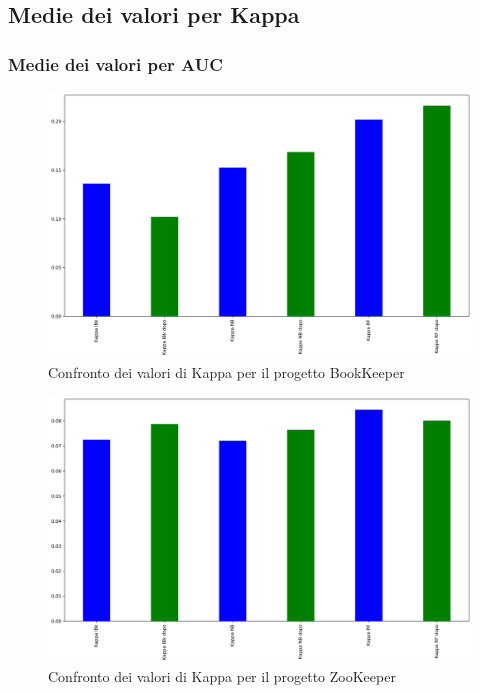 \documentclass[10pt]{beamer}
\begin{document}
\begin{frame}
\section{Medie dei valori per Kappa}
\frametitle{Medie dei valori per AUC}
\begin{minipage}[t]{0.5\textwidth}%
\begin{figure}
\includegraphics[scale=0.18]{images/k_bar_bk}
\caption{Confronto dei valori di Kappa per il progetto BookKeeper}
\end{figure}
\end{minipage}%
\begin{minipage}[t]{0.5\textwidth}
\begin{figure}
\includegraphics[scale=0.18]{images/k_bar_zk}
\caption{Confronto dei valori di Kappa per il progetto ZooKeeper}
\end{figure}
\end{minipage}
\end{frame}
\end{document}
